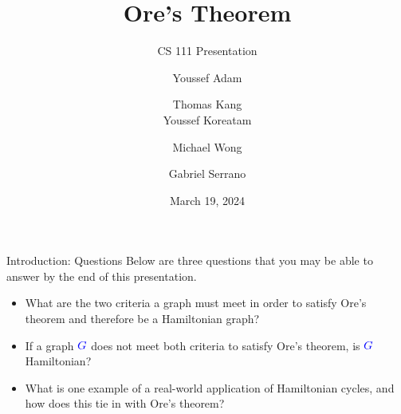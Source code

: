 \documentclass[pdf]{beamer}
\title{Ore's Theorem}
\subtitle{CS 111 Presentation}
\author{Youssef Adam \and Thomas Kang \\ Youssef Koreatam \and Michael Wong \and Gabriel Serrano}
\date{March 19, 2024}
\institute{Department of Computer Science, University of California, Riverside}
\newcommand{\G}{\textcolor{blue}{G}}
\begin{document}
    \begin{frame}
        \titlepage
    \end{frame}

    \begin{frame}{Introduction: Questions}
        Below are three questions that you may be able to answer by the end of this presentation.
        \vspace{10px}
        \begin{itemize}
            \item What are the two criteria a graph must meet in order to satisfy Ore's theorem and therefore be a Hamiltonian graph?
            \item If a graph $\G$ does not meet both criteria to satisfy Ore's theorem, is $\G$ Hamiltonian?
            \item What is one example of a real-world application of Hamiltonian cycles, and how does this tie in with Ore's theorem?
        \end{itemize}
    \end{frame}
\end{document}
